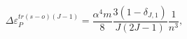 \begin{equation}
\Delta \varepsilon _{P}^{tr\left( s-o\right) (J-1)}=\frac{\alpha ^{4}m}{8}%
\frac{3\left( 1-\delta _{J,1}\right) }{J\left( 2J-1\right) }\frac{1}{n^{3}},
\end{equation}

